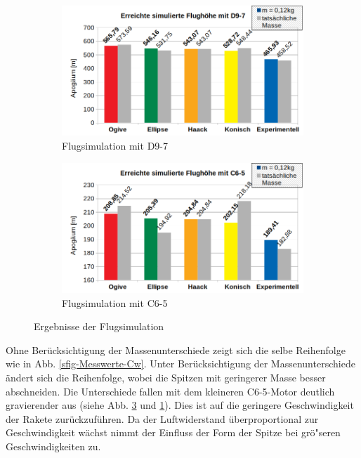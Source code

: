 \documentclass[10pt,a4paper]{article}
\begin{document}
\begin{figure}[h]
\begin{subfigure}[l]{0.49\textwidth}
	\centering
	\includegraphics[width=\textwidth]{Bilder/Flugsimulation-D9-7.png}
	\caption{Flugsimulation mit \textsf{D9-7}}
	\label{sfig-Flugsimulation-D9-7}
\end{subfigure}
\begin{subfigure}[r]{0.49\textwidth}
	\centering
	\includegraphics[width=\textwidth]{Bilder/Flugsimulation-C6-5.png}
	\caption{Flugsimulation mit \textsf{C6-5}}
	\label{sfig-Flugsimulation-C6-5}
\end{subfigure}
\caption{Ergebnisse der Flugsimulation}
\end{figure}

\noindent
Ohne Berücksichtigung der Massenunterschiede zeigt sich die selbe Reihenfolge wie in Abb. \ref{sfig-Messwerte-Cw}. Unter Berücksichtigung der Massenunterschiede ändert sich die Reihenfolge, wobei die Spitzen mit geringerer Masse besser abschneiden. Die Unterschiede fallen mit dem kleineren \textsf{C6-5}-Motor deutlich gravierender aus (siehe Abb. \ref{sfig-Flugsimulation-C6-5} und \ref{sfig-Flugsimulation-D9-7}). Dies ist auf die geringere Geschwindigkeit der Rakete zurückzuführen. Da der Luftwiderstand überproportional zur Geschwindigkeit wächst nimmt der Einfluss der Form der Spitze bei grö"seren Geschwindigkeiten zu.
\end{document}
